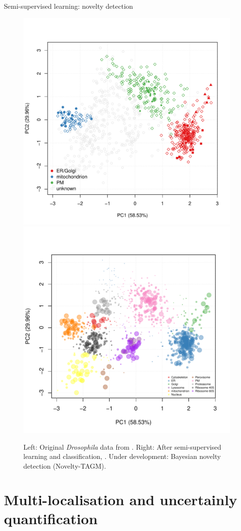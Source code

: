 \documentclass{beamer}
\theoremstyle{example}
\begin{document}
\begin{frame}{Semi-supervised learning: novelty detection}
  \begin{figure}
    \includegraphics[width=.48\linewidth]{figs/tan2009r1org.pdf}
    \includegraphics[width=.5\linewidth]{figs/pdres2fig.pdf}
    \caption{Left: Original \textit{Drosophila} data from
      \cite{Tan2009}. Right: After semi-supervised learning and
      classification, \cite{Breckels:2013}. Under development:
      Bayesian novelty detection (Novelty-TAGM).}
  \end{figure}
\end{frame}



\section{Multi-localisation and uncertainly quantification}
\end{document}
